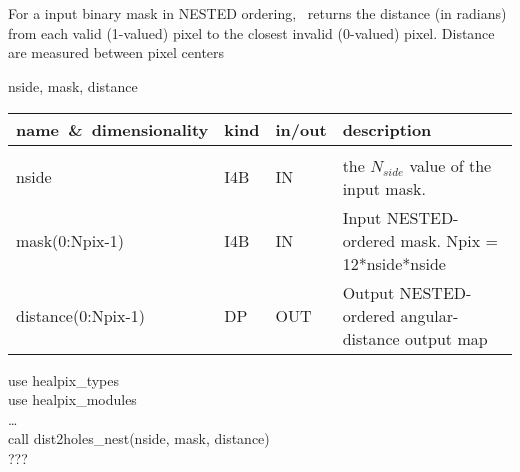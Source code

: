 \sloppy
{}\section[dist2holes\_nest]{ }
\label{sub:dist2holes_nest}
\author{Eric Hivon}

\begin{facility}
{For a input binary mask in NESTED ordering, \thedocid\ returns the distance (in
radians) from each valid (1-valued) pixel to the closest invalid (0-valued)
pixel. Distance are measured between pixel centers}
{\modMaskTools}
\end{facility}

\begin{f90format}
{nside, mask, distance}
\end{f90format}

\begin{arguments}
{
\begin{tabular}{p{0.35\hsize} p{0.05\hsize} p{0.1\hsize} p{0.40\hsize}} \hline  
\textbf{name~\&~dimensionality} & \textbf{kind} & \textbf{in/out} & \textbf{description} \\ \hline
                   &   &   &                           \\ %
nside & I4B & IN & the $N_{side}$ value of the input mask. \\
mask(0:Npix-1) & I4B & IN & Input NESTED-ordered mask. Npix = 12*nside*nside\\
distance(0:Npix-1) & DP & OUT & Output NESTED-ordered angular-distance output map
\end{tabular}
}
\end{arguments}

\begin{example}
{
use healpix\_types \\
use healpix\_modules \\
\ldots \\
call dist2holes\_nest(nside, mask, distance)  \\
}
{???
}
\end{example}

